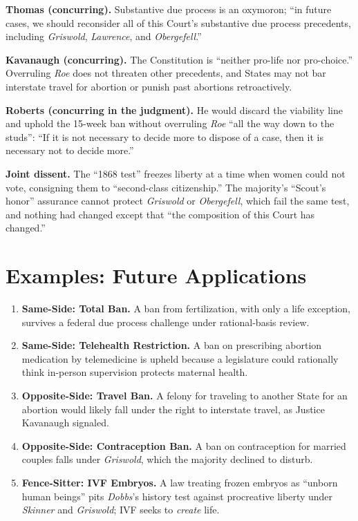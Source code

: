 \documentclass[12pt]{article}
\begin{document}
\textbf{Thomas (concurring).} Substantive due process is an oxymoron; ``in future cases, we should reconsider all of this Court's substantive due process precedents, including \textit{Griswold}, \textit{Lawrence}, and \textit{Obergefell}.''

\textbf{Kavanaugh (concurring).} The Constitution is ``neither pro-life nor pro-choice.'' Overruling \textit{Roe} does not threaten other precedents, and States may not bar interstate travel for abortion or punish past abortions retroactively.

\textbf{Roberts (concurring in the judgment).} He would discard the viability line and uphold the 15-week ban without overruling \textit{Roe} ``all the way down to the studs'': ``If it is not necessary to decide more to dispose of a case, then it is necessary not to decide more.''

\textbf{Joint dissent.} The ``1868 test'' freezes liberty at a time when women could not vote, consigning them to ``second-class citizenship.'' The majority's ``Scout's honor'' assurance cannot protect \textit{Griswold} or \textit{Obergefell}, which fail the same test, and nothing had changed except that ``the composition of this Court has changed.''

\section{Examples: Future Applications}

\begin{enumerate}
\item \textbf{Same-Side: Total Ban.} A ban from fertilization, with only a life exception, survives a federal due process challenge under rational-basis review.
\item \textbf{Same-Side: Telehealth Restriction.} A ban on prescribing abortion medication by telemedicine is upheld because a legislature could rationally think in-person supervision protects maternal health.
\item \textbf{Opposite-Side: Travel Ban.} A felony for traveling to another State for an abortion would likely fall under the right to interstate travel, as Justice Kavanaugh signaled.
\item \textbf{Opposite-Side: Contraception Ban.} A ban on contraception for married couples falls under \textit{Griswold}, which the majority declined to disturb.
\item \textbf{Fence-Sitter: IVF Embryos.} A law treating frozen embryos as ``unborn human beings'' pits \textit{Dobbs}'s history test against procreative liberty under \textit{Skinner} and \textit{Griswold}; IVF seeks to \textit{create} life.
\end{enumerate}
\end{document}
